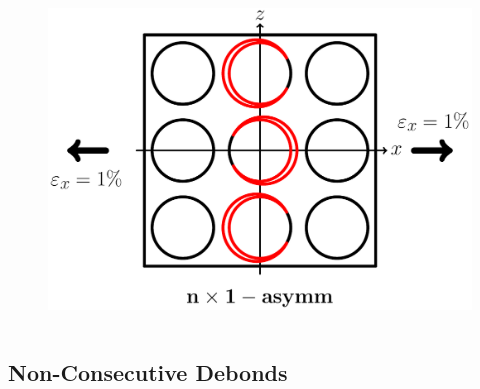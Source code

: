 \documentclass[first,firstsupp,lastsupp,last,hyperref,table]{ETHclass}
\begin{document}
\begin{frame}
\begin{columns}
\begin{column}{0.35\textwidth}
\begin{figure}
\end{figure}
\vspace{-0.5cm}
\begin{figure}
\centering
\includegraphics[width=\columnwidth]{twofibers-oppositeside-dtheta150.pdf}
\end{figure}
\end{column}
\end{columns}
\end{frame}

\subsection{Non-Consecutive Debonds}
\end{document}
